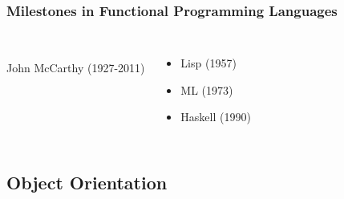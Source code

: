 \documentclass[dvipsnames]{beamer}
\theoremstyle{plain}
\begin{document}
\begin{frame}
  \frametitle{Milestones in Functional Programming Languages}

  \begin{columns}
    \begin{center}
      \\
      John McCarthy (1927-2011)
    \end{center}

    \begin{itemize}
      \item Lisp (1957)
      \item ML (1973)
      \item Haskell (1990)
    \end{itemize}
  \end{columns}
\end{frame}

\subsection{Object Orientation}
\end{document}
